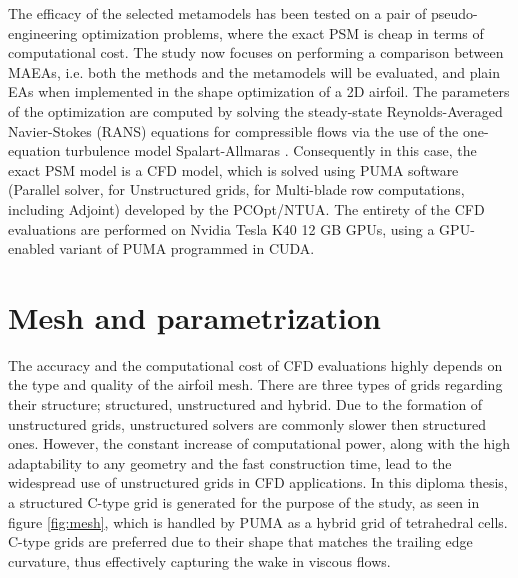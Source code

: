 The efficacy of the selected metamodels has been tested on 
a pair of pseudo-engineering optimization problems, where the exact 
PSM is cheap in terms of computational cost. The study now focuses 
on performing a comparison between MAEAs, i.e. both the methods and 
the metamodels will be evaluated, and plain EAs when implemented in 
the shape optimization of a 2D airfoil. The parameters of the 
optimization are computed by solving the steady-state 
Reynolds-Averaged Navier-Stokes (RANS) equations for compressible 
flows via the use of the one-equation turbulence model 
Spalart-Allmaras \cite{Spalart Allmaras}. Consequently in this 
case, the exact PSM model is a CFD model, which is solved using 
PUMA software (Parallel solver, for Unstructured grids, for 
Multi-blade row computations, including Adjoint) \cite{PUMA} 
developed by the PCOpt/NTUA. The entirety of the CFD evaluations 
are performed on Nvidia Tesla K40 12 GB GPUs, using a GPU-enabled 
variant \cite{PUMA_GPU} of PUMA programmed in CUDA.
\vfill


\section{Mesh and parametrization}

The accuracy and the computational cost of CFD evaluations highly
depends on the type and quality of the airfoil mesh. There are 
three types of grids regarding their structure; structured, 
unstructured and hybrid. 
Due to the formation of 
unstructured grids, unstructured solvers are commonly slower then 
structured ones. However, the constant increase of computational 
power, along with the high adaptability to any geometry and the 
fast construction time, lead to the widespread use of unstructured 
grids in CFD applications. In this diploma thesis, a structured 
C-type grid is generated for the purpose of the study, as seen in 
figure \ref{fig:mesh}, which is handled by PUMA as a 
hybrid grid of tetrahedral cells. C-type grids are preferred due to 
their shape that matches the trailing edge curvature, thus 
effectively capturing the wake in viscous flows.

